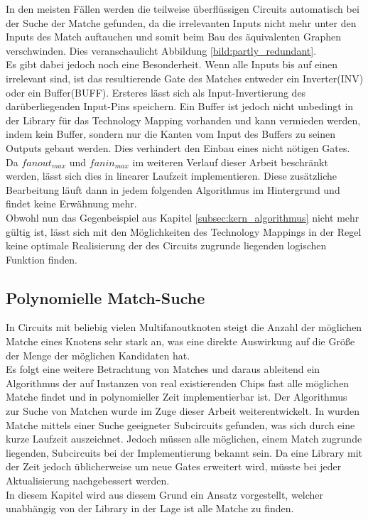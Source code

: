 \documentclass[11pt, a4paper, german]{article}
\newcommand{\TM}{Technology  Mapping }
\begin{document}
In den meisten Fällen werden die teilweise überflüssigen Circuits automatisch bei der  Suche der Matche gefunden, da die irrelevanten Inputs nicht mehr unter den Inputs des Match auftauchen und somit beim Bau des äquivalenten Graphen verschwinden. Dies veranschaulicht Abbildung \ref{bild:partly_redundant}. \\
Es gibt dabei jedoch noch eine Besonderheit. Wenn alle Inputs bis auf einen irrelevant sind, ist das resultierende Gate des Matches entweder ein Inverter(INV) oder ein Buffer(BUFF). Ersteres lässt sich als Input-Invertierung des darüberliegenden Input-Pins speichern. Ein Buffer ist jedoch nicht unbedingt in der Library für das \TM vorhanden und kann vermieden werden, indem kein Buffer, sondern nur die Kanten vom Input des Buffers zu seinen Outputs gebaut werden. Dies verhindert den Einbau eines nicht nötigen Gates. Da $fanout_{max}$ und $fanin_{max}$ im weiteren Verlauf dieser Arbeit beschränkt werden, lässt sich dies in linearer Laufzeit implementieren. Diese zusätzliche Bearbeitung läuft dann in jedem folgenden Algorithmus im Hintergrund und findet keine Erwähnung mehr.\\
 Obwohl nun das Gegenbeispiel aus Kapitel \ref{subsec:kern_algorithmus} nicht mehr gültig ist, lässt sich mit den Möglichkeiten des Technology Mappings in der Regel keine optimale Realisierung der des Circuits zugrunde liegenden logischen Funktion finden.
 
 
\subsection{Polynomielle Match-Suche}
\label{subsec:match_kandidaten}
In Circuits mit beliebig vielen Multifanoutknoten steigt die Anzahl der möglichen Matche eines Knotens sehr stark an, was eine direkte Auswirkung auf die Größe der Menge der möglichen Kandidaten hat. \\
Es folgt eine weitere Betrachtung von Matches und daraus ableitend ein Algorithmus der auf Instanzen von real existierenden Chips fast alle möglichen Matche findet und in polynomieller Zeit implementierbar ist. Der Algorithmus zur Suche von Matchen wurde im Zuge dieser Arbeit weiterentwickelt. In \cite{Elbert} wurden Matche mittels einer Suche geeigneter Subcircuits gefunden, was sich durch eine kurze Laufzeit auszeichnet. Jedoch müssen alle möglichen, einem Match zugrunde liegenden,  Subcircuits bei der Implementierung bekannt sein. Da eine Library mit der Zeit jedoch üblicherweise um neue Gates erweitert wird, müsste bei jeder Aktualisierung nachgebessert werden.\\ 
In diesem Kapitel wird aus diesem Grund ein Ansatz vorgestellt, welcher unabhängig von der Library in der Lage ist alle Matche zu finden. 
\end{document}
